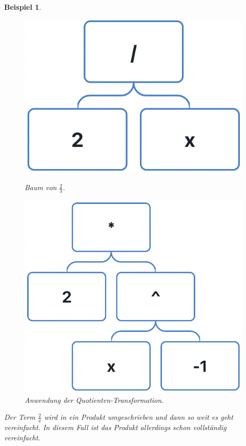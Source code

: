 \documentclass[11pt]{article}
\newtheorem{example}{Beispiel}
\begin{document}
\begin{example} \normalfont
  \begin{figure}[h]
    \begin{minipage}{.5\textwidth}
      \centering
      \includegraphics[scale=0.4]{trees/division/beispiel_1_1.png}
      \caption{Baum von $\frac{2}{3}$.}
    \end{minipage}
    \begin{minipage}{.5\textwidth}
      \centering
      \includegraphics[scale=0.4]{trees/division/beispiel_1_2.png}
      \caption{Anwendung der Quotienten-Transformation.}
    \end{minipage}
  \end{figure}
  Der Term $\frac{2}{x}$ wird in ein Produkt umgeschrieben und dann so weit es geht vereinfacht. In diesem Fall
  ist das Produkt allerdings schon vollständig vereinfacht.
\end{example}
\end{document}
